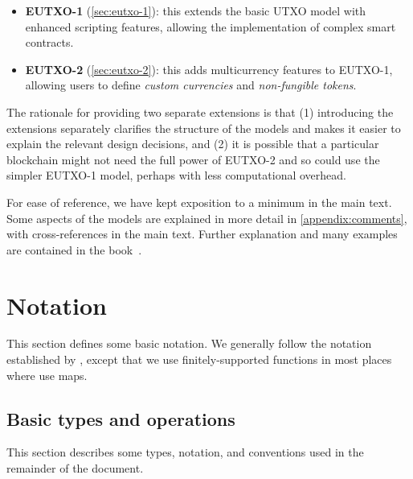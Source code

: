 \documentclass[a4paper]{article}
\begin{document}
\begin{itemize}
  \item \textbf{EUTXO-1} (\cref{sec:eutxo-1}): this extends the
    basic UTXO model with enhanced scripting features, allowing the
    implementation of complex smart contracts.
  \item \textbf{EUTXO-2} (\cref{sec:eutxo-2}): this adds
    multicurrency features to EUTXO-1, allowing users to define
    \textit{custom currencies} and \textit{non-fungible tokens}.
\end{itemize}


\medskip

The rationale for providing two separate extensions is that (1)
introducing the extensions separately clarifies the structure of the
models and makes it easier to explain the relevant design decisions,
and (2) it is possible that a particular blockchain might not need the
full power of EUTXO-2 and so could use the simpler EUTXO-1 model,
perhaps with less computational overhead.

\medskip

For ease of reference, we have kept exposition to a minimum in the main
text.  Some aspects of the models are explained in more detail
in \cref{appendix:comments}, with cross-references in the main
text.  Further explanation and many examples are contained in the
book~\citep{Plutus-book}.


\section{Notation}
This section defines some basic notation.  We generally follow the
notation established by \citep{Zahnentferner18-UTxO}, except that we use
finitely-supported functions in most places where \citep{Zahnentferner18-UTxO}
use maps.

\subsection{Basic types and operations}
\label{sec:basic-notation}

This section describes some types, notation, and
conventions used in the remainder of the document.
\end{document}
